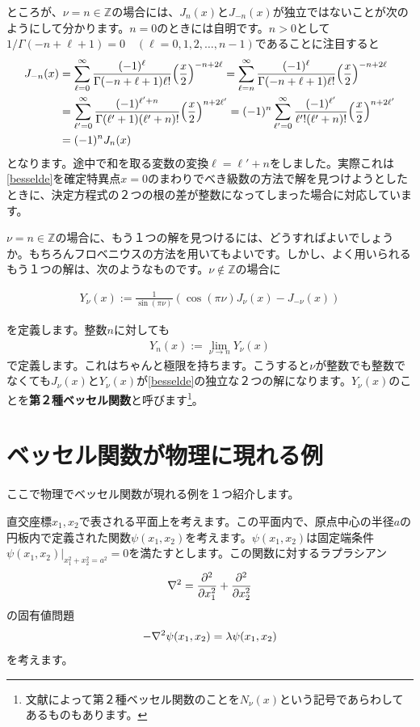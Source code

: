 \documentclass[report,paper=a4, fontsize=12pt, line_length=16cm, number_of_lines=33,dvipdfmx]{jlreq}
\newenvironment{important}{\begin{tcolorbox}[
  colback = white,
  colframe = red!35,
  boxrule = 2mm,
  fonttitle = \bfseries,
  after = \noindent] }{\end{tcolorbox}}
\numberwithin{equation}{section}
\newcommand{\Zb}{\mathbb{Z}}
\newcommand{\strong}[1]{\textsf{\bfseries #1}}
\begin{document}
ところが、$\nu=n\in \Zb$の場合には、$J_{n}(x)$と$J_{-n}(x)$が独立ではないことが次のようにして分かります。$n=0$のときには自明です。$n>0$として$1/\Gamma(-n+\ell+1)=0\quad (\ell=0,1,2,\dots,n-1)$であることに注目すると
\begin{align}
  J_{-n}(x)
  &=\sum_{\ell=0}^{\infty}\frac{(-1)^{\ell}}{\Gamma(-n+\ell+1)\ell !}\qty(\frac{x}{2})^{-n+2\ell}
  =\sum_{\ell=n}^{\infty}\frac{(-1)^{\ell}}{\Gamma(-n+\ell+1)\ell !}\qty(\frac{x}{2})^{-n+2\ell}\nonumber\\
  &=\sum_{\ell'=0}^{\infty}\frac{(-1)^{\ell'+n}}{\Gamma(\ell'+1)(\ell'+n) !}\qty(\frac{x}{2})^{n+2\ell'}
  =(-1)^n\sum_{\ell'=0}^{\infty}\frac{(-1)^{\ell'}}{\ell'!(\ell'+n) !}\qty(\frac{x}{2})^{n+2\ell'}\nonumber\\
  &=(-1)^n J_{n}(x)
\end{align}
となります。途中で和を取る変数の変換$\ell=\ell'+n$をしました。実際これは\eqref{besselde}を確定特異点$x=0$のまわりでべき級数の方法で解を見つけようとしたときに、決定方程式の２つの根の差が整数になってしまった場合に対応しています。

$\nu=n\in \Zb$の場合に、もう１つの解を見つけるには、どうすればよいでしょうか。もちろんフロベニウスの方法を用いてもよいです。しかし、よく用いられるもう１つの解は、次のようなものです。$\nu \notin \Zb$の場合に
\begin{important}
  \begin{align}
    Y_{\nu}(x):=\frac{1}{\sin(\pi\nu)}(\cos(\pi\nu)J_{\nu}(x)-J_{-\nu}(x))
  \end{align}
\end{important}
を定義します。整数$n$に対しても
\begin{align}
  Y_n(x):=\lim_{\nu\to n}Y_{\nu}(x)
\end{align}
で定義します。これはちゃんと極限を持ちます。こうすると$\nu$が整数でも整数でなくても$J_{\nu}(x)$と$Y_{\nu}(x)$が\eqref{besselde}の独立な２つの解になります。$Y_{\nu}(x)$のことを\strong{第２種ベッセル関数}と呼びます\footnote{文献によって第２種ベッセル関数のことを$N_{\nu}(x)$という記号であらわしてあるものもあります。}。

\section{ベッセル関数が物理に現れる例}
ここで物理でベッセル関数が現れる例を１つ紹介します。

直交座標$x_1,x_2$で表される平面上を考えます。この平面内で、原点中心の半径$a$の円板内で定義された関数$\psi(x_1,x_2)$を考えます。$\psi(x_1,x_2)$は固定端条件$\psi(x_1,x_2)|_{x_1^2+x_2^2=a^2}=0$を満たすとします。この関数に対するラプラシアン
\begin{align}
  \laplacian=\pdv[2]{x_1}+\pdv[2]{x_2}
\end{align}
の固有値問題
\begin{align}
  -\laplacian \psi(x_1,x_2)=\lambda \psi(x_1,x_2)\label{disklaplaceeigenfunc}
\end{align}
を考えます。
\end{document}
